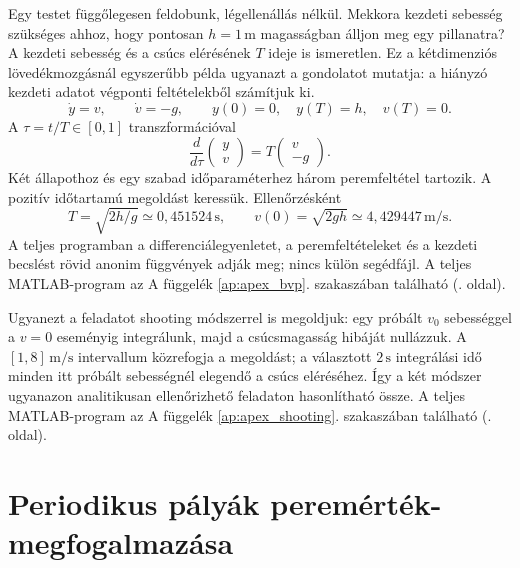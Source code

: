 Egy testet függőlegesen feldobunk, légellenállás nélkül. Mekkora kezdeti sebesség szükséges ahhoz, hogy pontosan $h=1\,\mathrm m$ magasságban álljon meg egy pillanatra? A kezdeti sebesség és a csúcs elérésének $T$ ideje is ismeretlen. Ez a kétdimenziós lövedékmozgásnál egyszerűbb példa ugyanazt a gondolatot mutatja: a hiányzó kezdeti adatot végponti feltételekből számítjuk ki.
\begin{equation}
\dot y=v,\qquad \dot v=-g,\qquad y(0)=0,\quad y(T)=h,\quad v(T)=0.
\end{equation}
A $\tau=t/T\in[0,1]$ transzformációval
\begin{equation}
\frac{d}{d\tau}\begin{pmatrix}y\\v\end{pmatrix}
=T\begin{pmatrix}v\\-g\end{pmatrix}.
\end{equation}
Két állapothoz és egy szabad időparaméterhez három peremfeltétel tartozik. A pozitív időtartamú megoldást keressük. Ellenőrzésként
\[
T=\sqrt{2h/g}\simeq0{,}451524\,\mathrm s,\qquad
v(0)=\sqrt{2gh}\simeq4{,}429447\,\mathrm{m/s}.
\]
A teljes programban a differenciálegyenletet, a peremfeltételeket és a kezdeti becslést rövid anonim függvények adják meg; nincs külön segédfájl.
\label{use:apex_bvp}A teljes MATLAB-program az A függelék \ref{ap:apex_bvp}. szakaszában található (\pageref{ap:apex_bvp}. oldal).

Ugyanezt a feladatot shooting módszerrel is megoldjuk: egy próbált $v_0$ sebességgel a $v=0$ eseményig integrálunk, majd a csúcsmagasság hibáját nullázzuk. A $[1,8]\,\mathrm{m/s}$ intervallum közrefogja a megoldást; a választott $2\,\mathrm s$ integrálási idő minden itt próbált sebességnél elegendő a csúcs eléréséhez. Így a két módszer ugyanazon analitikusan ellenőrizhető feladaton hasonlítható össze.
\label{use:apex_shooting}A teljes MATLAB-program az A függelék \ref{ap:apex_shooting}. szakaszában található (\pageref{ap:apex_shooting}. oldal).
\exampleend

\section{Periodikus pályák peremérték-megfogalmazása}
\label{sec:per_palya_perem_megfog}

